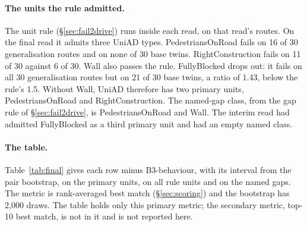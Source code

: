 \paragraph{The units the rule admitted.}
The unit rule (\S\ref{sec:fail2drive}) runs inside each read, on that read's
routes.
On the final read it admits three UniAD types. PedestriansOnRoad fails on 16 of
30 generalisation routes and on none of 30 base twins. RightConstruction fails
on 11 of 30 against 6 of 30. Wall also passes the rule. FullyBlocked drops out:
it fails on all 30 generalisation routes but on 21 of 30 base twins, a ratio of
1.43, below the rule's 1.5. Without Wall, UniAD therefore has two primary units,
PedestriansOnRoad and RightConstruction. The named-gap class, from the gap rule
of \S\ref{sec:fail2drive}, is PedestriansOnRoad and Wall. The interim read had
admitted FullyBlocked as a third primary unit and had an empty named class.

\paragraph{The table.}
Table~\ref{tab:final} gives each row minus B3-behaviour, with its interval from
the pair bootstrap, on the primary units, on all rule units and on the named
gaps.
The metric is rank-averaged best match (\S\ref{sec:scoring}) and the bootstrap
has 2{,}000 draws. The table holds only this primary metric; the secondary
metric, top-10 best match, is not in it and is not reported here.

